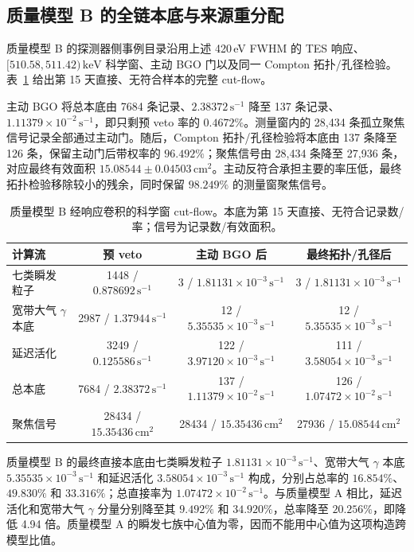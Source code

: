 \documentclass[11pt]{article}
\newcommand{\keV}{\,\mathrm{keV}}
\newcommand{\cps}{\,\mathrm{s^{-1}}}
\begin{document}
\FloatBarrier

\subsection{质量模型 B 的全链本底与来源重分配}
\label{subsec:optimized_fullchain_zh}

质量模型 B 的探测器侧事例目录沿用上述 420\,eV FWHM 的 TES 响应、$[510.58,511.42)\keV$ 科学窗、主动 BGO 门以及同一 Compton 拓扑/孔径检验。表~\ref{tab:optimized_cutflow_zh} 给出第 15 天直接、无符合样本的完整 cut-flow。

主动 BGO 将总本底由 7684 条记录、$2.38372\cps$ 降至 137 条记录、$1.11379\times10^{-2}\cps$，即只剩预 veto 率的 $0.4672\%$。测量窗内的 28,434 条孤立聚焦信号记录全部通过主动门。随后，Compton 拓扑/孔径检验将本底由 137 条降至 126 条，保留主动门后带权率的 $96.492\%$；聚焦信号由 28,434 条降至 27,936 条，对应最终有效面积 $15.08544\pm0.04503\,\mathrm{cm^2}$。主动反符合承担主要的率压低，最终拓扑检验移除较小的残余，同时保留 $98.249\%$ 的测量窗聚焦信号。

\begin{table}[H]
\centering
\caption{质量模型 B 经响应卷积的科学窗 cut-flow。本底为第 15 天直接、无符合记录数/率；信号为记录数/有效面积。}
\label{tab:optimized_cutflow_zh}
\footnotesize
\begin{tabular}{lccc}
\toprule
计算流 & 预 veto & 主动 BGO 后 & 最终拓扑/孔径后 \\
\midrule
七类瞬发粒子 & 1448 / $0.878692\cps$ & 3 / $1.81131\times10^{-3}\cps$ & 3 / $1.81131\times10^{-3}\cps$ \\
宽带大气 $\gamma$ 本底 & 2987 / $1.37944\cps$ & 12 / $5.35535\times10^{-3}\cps$ & 12 / $5.35535\times10^{-3}\cps$ \\
延迟活化 & 3249 / $0.125586\cps$ & 122 / $3.97120\times10^{-3}\cps$ & 111 / $3.58054\times10^{-3}\cps$ \\
总本底 & 7684 / $2.38372\cps$ & 137 / $1.11379\times10^{-2}\cps$ & 126 / $1.07472\times10^{-2}\cps$ \\
聚焦信号 & 28434 / $15.35436\,\mathrm{cm^2}$ & 28434 / $15.35436\,\mathrm{cm^2}$ & 27936 / $15.08544\,\mathrm{cm^2}$ \\
\bottomrule
\end{tabular}
\end{table}

质量模型 B 的最终直接本底由七类瞬发粒子 $1.81131\times10^{-3}\cps$、宽带大气 $\gamma$ 本底 $5.35535\times10^{-3}\cps$ 和延迟活化 $3.58054\times10^{-3}\cps$ 构成，分别占总率的 $16.854\%$、$49.830\%$ 和 $33.316\%$；总直接率为 $1.07472\times10^{-2}\cps$。与质量模型 A 相比，延迟活化和宽带大气 $\gamma$ 分量分别降至其 $9.492\%$ 和 $34.920\%$，总率降至 $20.256\%$，即降低 4.94 倍。质量模型 A 的瞬发七族中心值为零，因而不能用中心值为这项构造跨模型比值。
\end{document}
